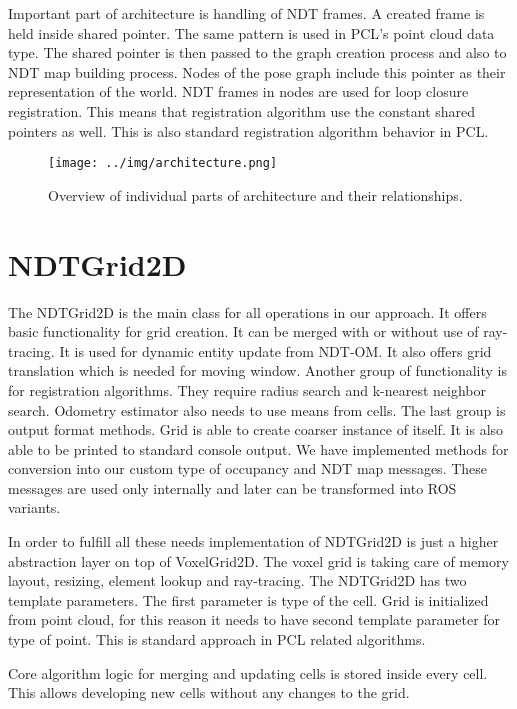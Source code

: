 Important part of architecture is handling of \gls{NDT} frames. A created frame is held inside shared pointer. The same pattern is used in \gls{PCL}'s point cloud data type. The shared pointer is then passed to the graph creation process and also to \gls{NDT} map building process. Nodes of the pose graph include this pointer as their representation of the world. \gls{NDT} frames in nodes are used for loop closure registration. This means that registration algorithm use the constant shared pointers as well. This is also standard registration algorithm behavior in \gls{PCL}. 
 
 \begin{figure}
 	\centering
 	\texttt{[image: ../img/architecture.png]}
 	\caption{Overview of individual parts of architecture and their relationships.}\label{fig:architecture}
 \end{figure}
      
\section{NDTGrid2D}
The NDTGrid2D is the main class for all operations in our approach. It offers basic functionality for grid creation. It can be merged with or without use of ray-tracing. It is used for dynamic entity update from \gls{NDT-OM}. It also offers grid translation which is needed for moving window. Another group of functionality is for registration algorithms. They require radius search and k-nearest neighbor search. Odometry estimator also needs to use means from cells. The last group is output format methods. Grid is able to create coarser instance of itself. It is also able to be printed to standard console output. We have implemented methods for conversion into our custom type of occupancy and \gls{NDT} map messages. These messages are used only internally and later can be transformed into \gls{ROS} variants.

In order to fulfill all these needs implementation of NDTGrid2D is just a higher abstraction layer on top of VoxelGrid2D. The voxel grid is taking care of memory layout, resizing, element lookup and ray-tracing. The NDTGrid2D has two template parameters. The first parameter is type of the cell. Grid is initialized from point cloud, for this reason it needs to have second template parameter for type of point. This is standard approach in \gls{PCL} related algorithms.  

Core algorithm logic for merging and updating cells is stored inside every cell. This allows developing new cells without any changes to the grid.
